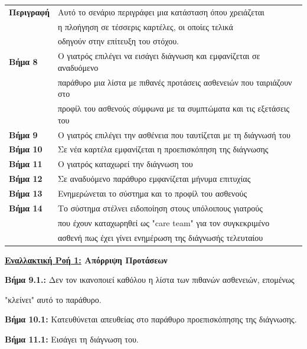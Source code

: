 \documentclass{article}
\newcommand\T{\rule{0pt}{2.6ex}}       %
\newcommand\B{\rule[-1.2ex]{0pt}{0pt}}
\begin{document}
\vspace{0.2cm}
 
 \begin{center}
     \begin{tabular}{|l|l|}
     \hline
      \textbf{Περιγραφή} & Αυτό το σενάριο περιγράφει μια κατάσταση όπου χρειάζεται \T \\& η πλοήγηση σε τέσσερις καρτέλες, οι οποίες τελικά\\& οδηγούν στην επίτευξη του στόχου. \B \\ 
      \hline
      \textbf{Βήμα 8} & O γιατρός επιλέγει να εισάγει διάγνωση και εμφανίζεται σε αναδυόμενο \T \\& παράθυρο μια λίστα με πιθανές προτάσεις ασθενειών που ταιριάζουν στο \\& προφίλ του ασθενούς σύμφωνα με τα συμπτώματα και τις εξετάσεις του \B \\
      \hline
      \textbf{Βήμα 9} & Ο γιατρός επιλέγει την ασθένεια που ταυτίζεται με τη διάγνωσή του  \T\B \\
      \hline
      \textbf{Βήμα 10} & Σε νέα καρτέλα εμφανίζεται η προεπισκόπηση της διάγνωσης \T\B \\
      \hline
      \textbf{Βήμα 11} & Ο γιατρός καταχωρεί την διάγνωση του \T\B \\
      \hline
      \textbf{Βήμα 12} & Σε αναδυόμενο παράθυρο εμφανίζεται μήνυμα επιτυχίας \T\B \\
      \hline    
      \textbf{Βήμα 13} & Ενημερώνεται το σύστημα και το προφίλ του ασθενούς \T\B \\
      \hline
      \textbf{Βήμα 14} & Το σύστημα στέλνει ειδοποίηση στους υπόλοιπους γιατρούς \T \\& που έχουν καταχωρηθεί ως "care team" για τον συγκεκριμένο \\& ασθενή πως έχει γίνει ενημέρωση της διάγνωσής τελευταίου \B \\
      \hline
    \end{tabular}
 \end{center}
 
\textbf{\underline{Εναλλακτική Ροή 1:} Απόρριψη Προτάσεων}  \vspace{0.2cm}
\par \textbf{Βήμα 9.1.:} Δεν τον ικανοποιεί καθόλου η λίστα των πιθανών ασθενειών, επομένως \par "κλείνει" αυτό το παράθυρο. \vspace{0.1cm}
\par \textbf{Βήμα 10.1:} Κατευθύνεται απευθείας στο παράθυρο προεπισκόπησης της διάγνωσης. \vspace{0.1cm}
\par \textbf{Βήμα 11.1:} Εισάγει τη διάγνωση του. \vspace{0.1cm}
\end{document}
